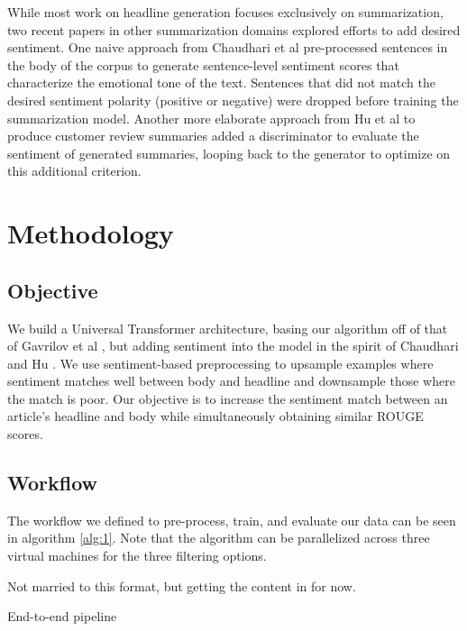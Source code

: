 \documentclass[11pt]{article}
\begin{document}
While most work on headline generation focuses exclusively on summarization, two recent papers in other summarization domains explored efforts to add desired sentiment. One naive approach from Chaudhari et al \cite{DBLP:journals/corr/abs-1802-09426} pre-processed sentences in the body of the corpus to generate sentence-level sentiment scores that characterize the emotional tone of the text. Sentences that did not match the desired sentiment polarity (positive or negative) were dropped before training the summarization model. Another more elaborate approach from Hu et al \cite{DBLP:journals/corr/HuYLSX17} to produce customer review summaries added a discriminator to evaluate the sentiment of generated summaries, looping back to the generator to optimize on this additional criterion. 

\section{Methodology}

\subsection{Objective}
We build a Universal Transformer architecture, basing our algorithm off of that of Gavrilov et al \cite{DBLP:journals/corr/abs-1901-07786}, but adding sentiment into the model in the spirit of Chaudhari   \cite{DBLP:journals/corr/abs-1802-09426} and Hu \cite{DBLP:journals/corr/HuYLSX17}. We use sentiment-based preprocessing to upsample examples where sentiment matches well between body and headline and downsample those where the match is poor. Our objective is to increase the sentiment match between an article's headline and body while simultaneously obtaining similar ROUGE scores.

\subsection{Workflow}

The workflow we defined to pre-process, train, and evaluate our data can be seen in algorithm \ref{alg:1}. Note that the algorithm can be parallelized across three virtual machines for the three filtering options.

Not married to this format, but getting the content in for now.

\begin{algorithm}[H]
\SetAlgoLined
 \caption{End-to-end pipeline}
\label{alg:1}
\end{algorithm}
\end{document}
